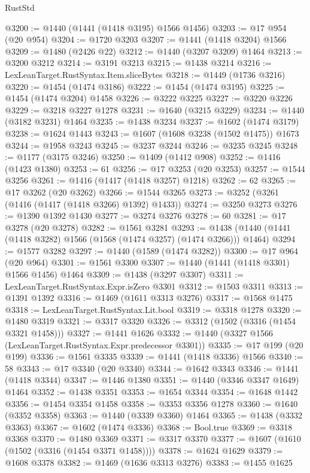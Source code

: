 \begin{lexlean}{RustStd}
\begin{coremodule}
@3200 := @1440 (@1441 (@1418 @3195) @1566 @1456)
@3203 := @17 @954 (@20 @954)
@3204 := @1720 @3203
@3207 := @1441 (@1418 @3204) @1566
@3209 := @1480 (@2426 @22)
@3212 := @1440 (@3207 @3209) @1464
@3213 := @3200 @3212
@3214 := @3191 @3213
@3215 := @1438 @3214
@3216 := LexLeanTarget.RustSyntax.Item.sliceBytes
@3218 := @1449 (@1736 @3216)
@3220 := @1454 (@1474 @3186)
@3222 := @1454 (@1474 @3195)
@3225 := @1454 (@1474 @3204) @1458
@3226 := @3222 @3225
@3227 := @3220 @3226
@3229 := @3218 @3227 @1278
@3231 := @1640 (@3215 @3229)
@3234 := @1440 (@3182 @3231) @1464
@3235 := @1438 @3234
@3237 := @1602 (@1474 @3179)
@3238 := @1624 @1443
@3243 := @1607 (@1608 @3238 (@1502 @1475)) @1673
@3244 := @1958 @3243
@3245 := @3237 @3244
@3246 := @3235 @3245
@3248 := @1177 (@3175 @3246)
@3250 := @1409 (@1412 @908)
@3252 := @1416 (@1423 @1380)
@3253 := 61
@3256 := @17 @3253 (@20 @3253)
@3257 := @1544 @3256
@3261 := @1416 (@1417 (@1418 @3257) @1218)
@3262 := 62
@3265 := @17 @3262 (@20 @3262)
@3266 := @1544 @3265
@3273 := @3252 (@3261 (@1416 (@1417 (@1418 @3266) @1392) @1433))
@3274 := @3250 @3273
@3276 := @1390 @1392 @1430
@3277 := @3274 @3276
@3278 := 60
@3281 := @17 @3278 (@20 @3278)
@3282 := @1561 @3281
@3293 := @1438 (@1440 (@1441 (@1418 @3282) @1566 (@1568 (@1474 @3257) (@1474 @3266))) @1464)
@3294 := @1577 @3282
@3297 := @1440 (@1589 (@1474 @3282))
@3300 := @17 @964 (@20 @964)
@3301 := @1561 @3300
@3307 := @1440 (@1441 (@1418 @3301) @1566 @1456) @1464
@3309 := @1438 (@3297 @3307)
@3311 := LexLeanTarget.RustSyntax.Expr.isZero @3301
@3312 := @1503 @3311
@3313 := @1391 @1392
@3316 := @1469 (@1611 @3313 @3276)
@3317 := @1568 @1475
@3318 := LexLeanTarget.RustSyntax.Lit.bool
@3319 := @3318 @1278
@3320 := @1480 @3319
@3321 := @3317 @3320
@3326 := @3312 (@1502 (@3316 (@1454 @3321 @1458)))
@3327 := @1441 @1626
@3332 := @1440 (@3327 @1566 (LexLeanTarget.RustSyntax.Expr.predecessor @3301))
@3335 := @17 @199 (@20 @199)
@3336 := @1561 @3335
@3339 := @1441 (@1418 @3336) @1566
@3340 := 58
@3343 := @17 @3340 (@20 @3340)
@3344 := @1642 @3343
@3346 := @1441 (@1418 @3344)
@3347 := @1446 @1380
@3351 := @1440 (@3346 @3347 @1649) @1464
@3352 := @1438 @3351
@3353 := @1654 @3344
@3354 := @1648 @1442
@3356 := @1454 @3354 @1458
@3358 := @3353 @3356 @1278
@3360 := @1640 (@3352 @3358)
@3363 := @1440 (@3339 @3360) @1464
@3365 := @1438 (@3332 @3363)
@3367 := @1602 (@1474 @3336)
@3368 := Bool.true
@3369 := @3318 @3368
@3370 := @1480 @3369
@3371 := @3317 @3370
@3377 := @1607 (@1610 (@1502 (@3316 (@1454 @3371 @1458))))
@3378 := @1624 @1629
@3379 := @1608 @3378
@3382 := @1469 (@1636 @3313 @3276)
@3383 := @1455 @1625

\end{coremodule}
\end{lexlean}
